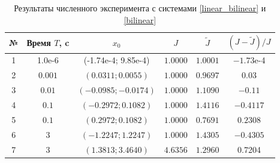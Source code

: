 \documentclass[../main.tex]{subfiles}
\begin{document}
\begin{table}
\caption{Результаты численного эксперимента с системами \eqref{linear_bilinear} и   \eqref{bilinear}}
\label{Example2_table}
\begin{center}
\begin{tabular}{c|c|c|c|c|c}
№       & Время $T$, c    &  $x_0$                  & $ J $                & $ \widetilde{J} $  & $  ( J -  \widetilde{J} ) / J$ \\ \hline
1       & 1.0e-6          &  (-1.74e-4; 9.85e-4)    & $ 1.0000 $           & $ 1.0001 $         & $-1.73$e-4 \\ \hline %
2       & $0.001 $        & $ (0.0311; 0.0055)  $   & $ 1.0000 $           & $ 0.9697 $         & $0.03$ \\ \hline %
3       & $0.01 $         & $ (-0.0985; -0.0174) $  & $ 1.0000 $           & $ 1.1090 $         &  $-0.11$\\ \hline %
4       & $0.1 $         & $ (-0.2972; 0.1082) $  & $ 1.0000 $           & $ 1.4116 $         &  $-0.4117$\\ \hline %
5       & $0.1 $         & $ (0.2972; 0.1082) $  & $ 1.0000 $           & $ 0.7691  $         &  $0.2308$\\ \hline %
6       & $ 3 $           & $ (-1.2247; 1.2247) $   & $1.0000 $            & $1.4305 $          &  $-0.4305$   \\ \hline %
7       & $ 3 $           & $ (1.3813; 3.4640) $    & $4.6356 $            & $1.2960 $          & 0.7204
\end{tabular}
\end{center}
\end{table} 
\end{document}
